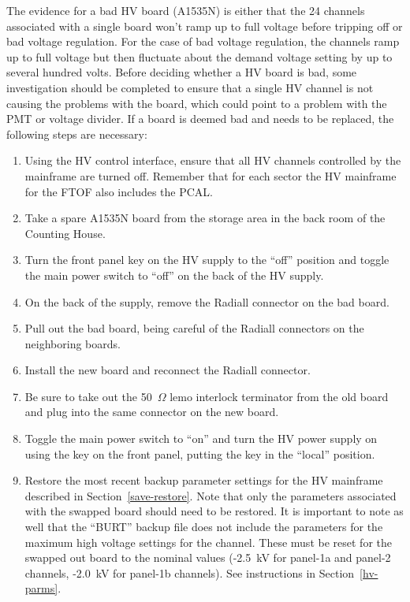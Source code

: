 \documentclass[12pt]{article}
\begin{document}
The evidence for a bad HV board (A1535N) is either that the 24 channels associated 
with a single board won't ramp up to full voltage before tripping off or bad voltage 
regulation. For the case of bad voltage regulation, the channels ramp up to full 
voltage but then fluctuate about the demand voltage setting by up to several hundred 
volts. Before deciding whether a HV board is bad, some investigation should be 
completed to ensure that a single HV channel is not causing the problems with the 
board, which could point to a problem with the PMT or voltage divider. If a board is 
deemed bad and needs to be replaced, the following steps are necessary:

\begin{enumerate}
\item Using the HV control interface, ensure that all HV channels controlled by the
mainframe are turned off. Remember that for each sector the HV mainframe for the FTOF
also includes the PCAL.
\item Take a spare A1535N board from the storage area in the back room of the Counting
House.
\item Turn the front panel key on the HV supply to the ``off'' position and toggle 
the main power switch to ``off'' on the back of the HV supply.
\item On the back of the supply, remove the Radiall connector on the bad board.
\item Pull out the bad board, being careful of the Radiall connectors on the neighboring 
boards.
\item Install the new board and reconnect the Radiall connector.
\item Be sure to take out the 50~$\Omega$ lemo interlock terminator from the old board 
and plug into the same connector on the new board.
\item Toggle the main power switch to ``on'' and turn the HV power supply on using the 
key on the front panel, putting the key in the ``local'' position.
\item Restore the most recent backup parameter settings for the HV mainframe described
in Section~\ref{save-restore}. Note that only the parameters associated with the swapped
board should need to be restored. It is important to note as well that the ``BURT'' backup
file does not include the parameters for the maximum high voltage settings for the channel.
These must be reset for the swapped out board to the nominal values (-2.5~kV for panel-1a
and panel-2 channels, -2.0~kV for panel-1b channels). See instructions in Section~\ref{hv-parms}.

\end{enumerate}
\end{document}
